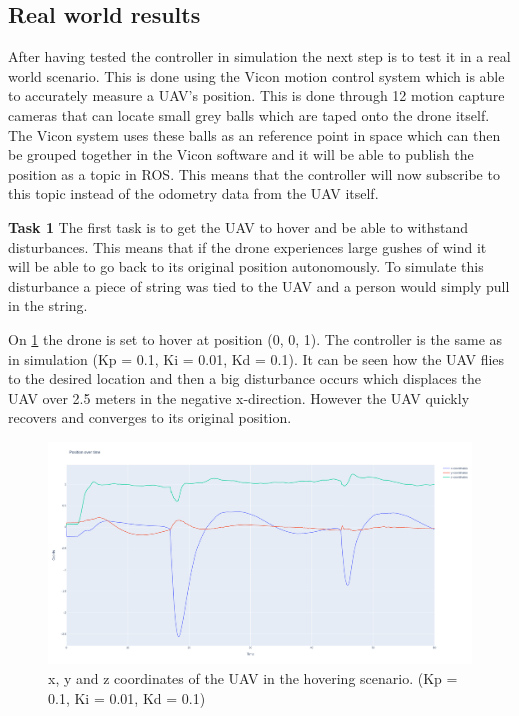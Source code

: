 \documentclass[conference]{IEEEtran}
\begin{document}
\subsection{Real world results}
After having tested the controller in simulation the next step is to test it in a real world scenario. This is done using the Vicon motion control system which is able to accurately measure a UAV's position. This is done through 12 motion capture cameras that can locate small grey balls which are taped onto the drone itself. The Vicon system uses these balls as an reference point in space which can then be grouped together in the Vicon software and it will be able to publish the position as a topic in ROS. This means that the controller will now subscribe to this topic instead of the odometry data from the UAV itself.

\textbf{Task 1}
The first task is to get the UAV to hover and be able to withstand disturbances. This means that if the drone experiences large gushes of wind it will be able to go back to its original position autonomously. To simulate this disturbance a piece of string was tied to the UAV and a person would simply pull in the string.

On \cref{fig:task1_10_pos} the drone is set to hover at position (0, 0, 1). The controller is the same as in simulation (Kp = 0.1, Ki = 0.01, Kd = 0.1). It can be seen how the UAV flies to the desired location and then a big disturbance occurs which displaces the UAV over 2.5 meters in the negative x-direction. However the UAV quickly recovers and converges to its original position.  

\begin{figure}[hbtp]
	\centering
	\includegraphics[width=1.0\linewidth]{images/task1_10_pos.png}
	\caption{x, y and z coordinates of the UAV in the hovering scenario. (Kp = 0.1, Ki = 0.01, Kd = 0.1)}
	\label{fig:task1_10_pos}
\end{figure}
\end{document}
